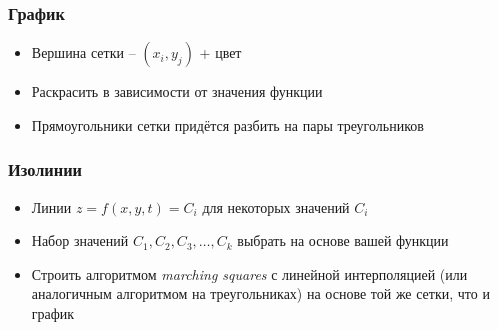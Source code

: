 \documentclass{beamer}
\begin{document}
\begin{frame}[fragile]
\frametitle{График}
\begin{itemize}
\item Вершина сетки -- \begin{math}(x_i, y_j)\end{math} + цвет
\item Раскрасить в зависимости от значения функции
\pause
\item Прямоугольники сетки придётся разбить на пары треугольников
\end{itemize}
\end{frame}

\begin{frame}[fragile]
\frametitle{Изолинии}
\begin{itemize}
\item Линии \begin{math}z = f(x,y,t) = C_i\end{math} для некоторых значений \begin{math}C_i\end{math}
\item Набор значений \begin{math}C_1, C_2, C_3, \dots, C_k\end{math} выбрать на основе вашей функции
\pause
\item Строить алгоритмом \textit{marching squares} с линейной интерполяцией (или аналогичным алгоритмом на треугольниках) на основе той же сетки, что и график
\end{itemize}
\end{frame}
\end{document}

